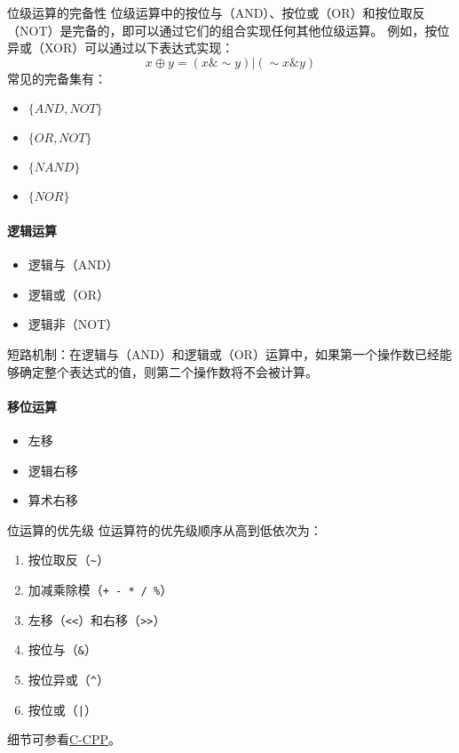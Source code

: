 \begin{sidenote}{位级运算的完备性}
    位级运算中的按位与（AND）、按位或（OR）和按位取反（NOT）是完备的，即可以通过它们的组合实现任何其他位级运算。
    例如，按位异或（XOR）可以通过以下表达式实现：
    $$ x \oplus y = (x \& \sim y) | (\sim x \& y) $$
    常见的完备集有：
    \begin{itemize}
        \item $\{AND, NOT\}$
        \item $\{OR, NOT\}$
        \item $\{NAND\}$
        \item $\{NOR\}$
    \end{itemize}
\end{sidenote}

\paragraph{逻辑运算}
\begin{itemize}
    \item 逻辑与（AND）
    \item 逻辑或（OR）
    \item 逻辑非（NOT）
\end{itemize}

短路机制：在逻辑与（AND）和逻辑或（OR）运算中，如果第一个操作数已经能够确定整个表达式的值，则第二个操作数将不会被计算。

\paragraph{移位运算}
\begin{itemize}
    \item 左移
    \item 逻辑右移
    \item 算术右移
\end{itemize}

\begin{sidenote}{位运算的优先级}
    位运算符的优先级顺序从高到低依次为：
    \begin{enumerate}
        \item 按位取反（\verb|~|）
        \item 加减乘除模（\verb|+ - * / %|）
        \item 左移（\verb|<<|）和右移（\verb|>>|）
        \item 按位与（\verb|&|）
        \item 按位异或（\verb|^|）
        \item 按位或（\verb!|!）
    \end{enumerate}
    细节可参看\href{https://c-cpp.com/c/language/operator_precedence}{C-CPP}。
\end{sidenote}

